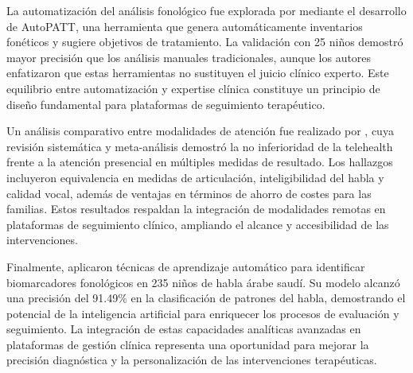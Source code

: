 \documentclass[12pt, oneside]{article}
\begin{document}
La automatización del análisis fonológico fue explorada por \textcite{Combiths2022} mediante el desarrollo de AutoPATT, una herramienta que genera automáticamente inventarios fonéticos y sugiere objetivos de tratamiento. La validación con 25 niños demostró mayor precisión que los análisis manuales tradicionales, aunque los autores enfatizaron que estas herramientas no sustituyen el juicio clínico experto. Este equilibrio entre automatización y expertise clínica constituye un principio de diseño fundamental para plataformas de seguimiento terapéutico.

Un análisis comparativo entre modalidades de atención fue realizado por \textcite{Scott2025}, cuya revisión sistemática y meta-análisis demostró la no inferioridad de la telehealth frente a la atención presencial en múltiples medidas de resultado. Los hallazgos incluyeron equivalencia en medidas de articulación, inteligibilidad del habla y calidad vocal, además de ventajas en términos de ahorro de costes para las familias. Estos resultados respaldan la integración de modalidades remotas en plataformas de seguimiento clínico, ampliando el alcance y accesibilidad de las intervenciones.

Finalmente, \textcite{Turki2025} aplicaron técnicas de aprendizaje automático para identificar biomarcadores fonológicos en 235 niños de habla árabe saudí. Su modelo alcanzó una precisión del 91.49\% en la clasificación de patrones del habla, demostrando el potencial de la inteligencia artificial para enriquecer los procesos de evaluación y seguimiento. La integración de estas capacidades analíticas avanzadas en plataformas de gestión clínica representa una oportunidad para mejorar la precisión diagnóstica y la personalización de las intervenciones terapéuticas.



\end{document}
